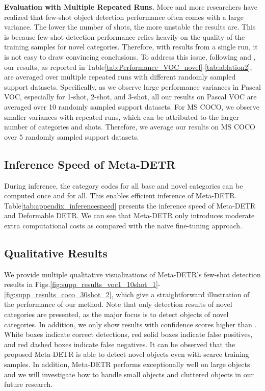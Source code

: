 \documentclass[10pt,twocolumn,letterpaper]{article}
\begin{document}
\smallskip
\noindent
\textbf{Evaluation with Multiple Repeated Runs.}
More and more researchers have realized that few-shot object detection performance often comes with a large variance. The lower the number of shots, the more unstable the results are. This is because few-shot detection performance relies heavily on the quality of the training samples for novel categories. Therefore, with results from a single run, it is not easy to draw convincing conclusions. To address this issue, following \cite{fsdet} and \cite{FSDetView}, our results, as reported in Table\;\ref{tab:Performance_VOC_novel}-\ref{tab:ablation2}, are averaged over multiple repeated runs with different randomly sampled support datasets. Specifically, as we observe large performance variances in Pascal VOC, especially for 1-shot, 2-shot, and 3-shot, all our results on Pascal VOC are averaged over 10 randomly sampled support datasets. For MS COCO, we observe smaller variances with repeated runs, which can be attributed to the larger number of categories and shots. Therefore, we average our results on MS COCO over 5 randomly sampled support datasets.





\subsection{Inference Speed of Meta-DETR}

During inference, the category codes for all base and novel categories can be computed once and for all. This enables efficient inference of Meta-DETR. Table\;\ref{tab:appendix_inferencespeed} presents the inference speed of Meta-DETR and Deformable DETR\;\cite{DeformableDETR}. We can see that Meta-DETR only introduces moderate extra computational costs as compared with the naive fine-tuning approach.


\subsection{Qualitative Results}

We provide multiple qualitative visualizations of Meta-DETR's few-shot detection results in Figs.\;\ref{fig:supp_results_voc1_10shot_1}-\ref{fig:supp_results_coco_30shot_2}, which give a straightforward illustration of the performance of our method. Note that only detection results of novel categories are presented, as the major focus is to detect objects of novel categories. In addition, we only show results with confidence scores higher than . White boxes indicate correct detections, red solid boxes indicate false positives, and red dashed boxes indicate false negatives. It can be observed that the proposed Meta-DETR is able to detect novel objects even with scarce training samples. In addition, Meta-DETR performs exceptionally well on large objects and we will investigate how to handle small objects and cluttered objects in our future research.
\end{document}

